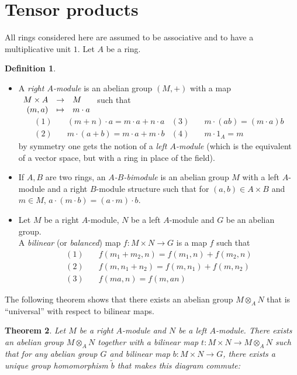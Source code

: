 \documentclass{article}
\newcommand{\applic}[4]{\begin{array}[t]{rcl}
#1 & \to & #2 \\
#3 & \mapsto & #4
\end{array}}
\theoremstyle{plain}
\newtheorem{theorem}{Theorem}[section]
\theoremstyle{definition}
\newtheorem{definition}[theorem]{Definition}
\theoremstyle{remark}
\begin{document}
\section{Tensor products}
All rings considered here are assumed to be associative and to have a multiplicative unit $1$. Let $A$ be a ring.
\begin{definition} \leavevmode
    \begin{itemize}
        \item A \emph{right $A$-module} is an abelian group $(M,+)$ with a map $\applic{M\times A}{M}{(m,a)}{m\cdot a}$ such that
        \begin{align*}
            (1) \quad & (m+n)\cdot a = m\cdot a +n\cdot a & (3)\quad & m\cdot(ab) = (m \cdot a)b \\
            (2) \quad & m \cdot (a+b) = m\cdot a + m \cdot b & (4)\quad & m\cdot 1_A = m
        \end{align*}
        by symmetry one gets the notion of a \emph{left $A$-module} (which is the equivalent of a vector space, but with a ring in place of the field).
        \item If $A,B$ are two rings, an \emph{$A$-$B$-bimodule} is an abelian group $M$ with a left $A$-module and a right $B$-module structure such that for $(a,b) \in A \times B$ and $m \in M$, $a \cdot (m\cdot b) = (a\cdot m) \cdot b$.
        \item Let $M$ be a right $A$-module, $N$ be a left $A$-module and $G$ be an abelian group. \\ A \emph{bilinear} (or \emph{balanced}) map $f : M\times N \to G$ is a map $f$ such that
        \begin{align*}
            (1) \quad & f(m_1 + m_2, n) = f(m_1,n) + f(m_2,n)\\
            (2) \quad & f(m,n_1 + n_2) = f(m,n_1) + f(m,n_2)\\
            (3) \quad & f(ma,n) = f(m,an)
        \end{align*}
    \end{itemize}
\end{definition}

The following theorem shows that there exists an abelian group $M \otimes_A N$ that is ``universal'' with respect to bilinear maps.

\begin{theorem}
    Let $M$ be a right $A$-module and $N$ be a left $A$-module. There exists an abelian group $M \otimes_A N$ together with a bilinear map $t : M \times N \to M \otimes_A N$ such that for any abelian group $G$ and bilinear map $b : M \times N \to G$, there exists a unique group homomorphism $\tilde{b}$ that makes this diagram commute:
    \begin{center}
    \end{center}
\end{theorem}
\end{document}

